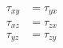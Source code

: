 
\begin{equation}
\begin{aligned}
\tau_{xy} &= \tau_{yx} \\
\tau_{xz} &= \tau_{zx} \\
\tau_{yz} &= \tau_{zy}
\end{aligned}
\end{equation}

